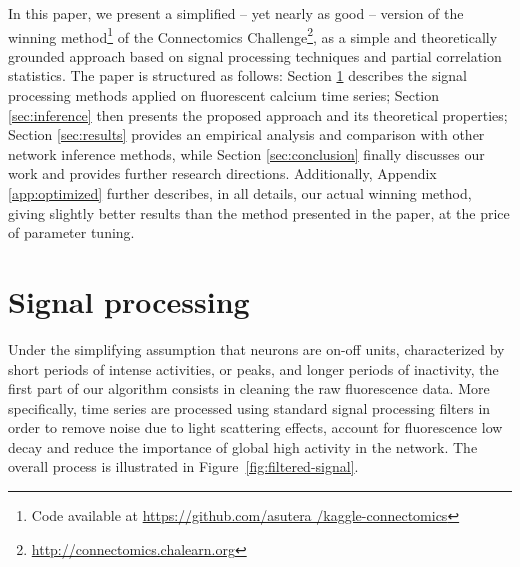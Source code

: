 \documentclass[wcp]{jmlr}
\begin{document}
In this paper, we present a simplified -- yet nearly as good -- version of the
winning method\footnote{Code available at \url{https://github.com/asutera
/kaggle-connectomics}} of the Connectomics
Challenge\footnote{\url{http://connectomics.chalearn.org}}, as a simple and
theoretically grounded approach based on signal processing techniques and
partial correlation statistics. The paper is structured as follows: Section
\ref{sec:filter} describes the signal processing methods applied on fluorescent
calcium time series; Section \ref{sec:inference} then presents the proposed
approach and its theoretical properties; Section \ref{sec:results} provides an
empirical analysis and comparison with other network inference methods, while
Section \ref{sec:conclusion} finally discusses our work and provides further
research directions. Additionally, Appendix \ref{app:optimized} further
describes, in all details, our actual winning method, giving slightly better
results than the method presented in the paper, at the price of parameter
tuning.


\section{Signal processing} \label{sec:filter}

Under the simplifying assumption that neurons are on-off units, characterized
by short periods of intense activities, or peaks, and longer periods of
inactivity, the first part of our algorithm consists in cleaning the raw
fluorescence data. More specifically, time series are processed using standard
signal processing filters in order to remove noise due to light scattering
effects, account for fluorescence  low decay and reduce the importance of
global high activity in the network. The overall process is illustrated in
Figure~\ref{fig:filtered-signal}.
\end{document}
